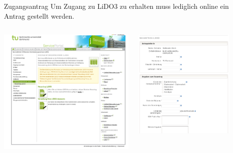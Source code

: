 \begin{frame}{Zugangsantrag}
  Um Zugang zu LiDO3 zu erhalten muss lediglich online ein Antrag gestellt werden.
  \begin{columns}
    \begin{column}{0.475\textwidth}
      \centering
      \includegraphics[width=\textwidth]{figs/lido_web.png}
    \end{column}
    \begin{column}{0.475\textwidth}
      \centering
      \includegraphics[width=0.8\textwidth]{figs/Neuantrag.png}
    \end{column}
  \end{columns}
\end{frame}


